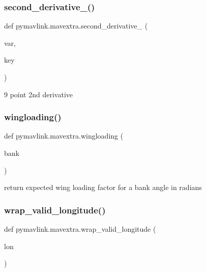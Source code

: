 \subsubsection{\texorpdfstring{second\+\_\+derivative\+\_()}{second\_derivative\_9()}}
{\footnotesize\ttfamily def pymavlink.\+mavextra.\+second\+\_\+derivative\+\_ (\begin{DoxyParamCaption}\item[{}]{var,  }\item[{}]{key }\end{DoxyParamCaption})}

\begin{DoxyVerb}9 point 2nd derivative\end{DoxyVerb}
 \mbox{\label{namespacepymavlink_1_1mavextra_abe7eb91429847abe6333b64f2fa5b39e}} 
\subsubsection{\texorpdfstring{wingloading()}{wingloading()}}
{\footnotesize\ttfamily def pymavlink.\+mavextra.\+wingloading (\begin{DoxyParamCaption}\item[{}]{bank }\end{DoxyParamCaption})}

\begin{DoxyVerb}return expected wing loading factor for a bank angle in radians\end{DoxyVerb}
 \mbox{\label{namespacepymavlink_1_1mavextra_ab34a549c8b911b6455f2d641af495192}} 
\subsubsection{\texorpdfstring{wrap\+\_\+valid\+\_\+longitude()}{wrap\_valid\_longitude()}}
{\footnotesize\ttfamily def pymavlink.\+mavextra.\+wrap\+\_\+valid\+\_\+longitude (\begin{DoxyParamCaption}\item[{}]{lon }\end{DoxyParamCaption})}

